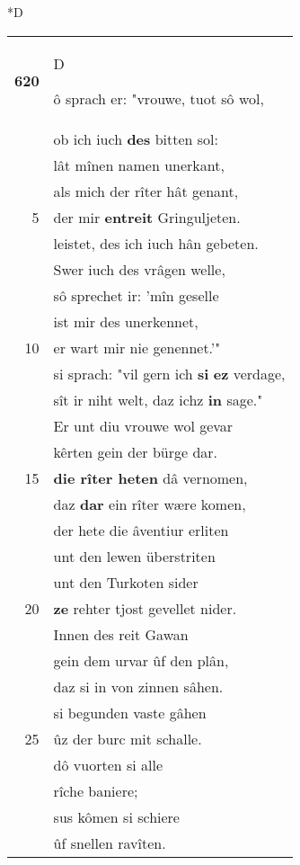 \documentclass[8pt,a4paper,notitlepage]{article}
\begin{document}
\begin{table}[ht]
\begin{minipage}[t]{0.5\linewidth}
\small
\begin{center}*D
\end{center}
\begin{tabular}{rl}
\textbf{620} & \begin{large}D\end{large}ô sprach er: "vrouwe, tuot sô wol,\\ 
 & ob ich iuch \textbf{des} bitten sol:\\ 
 & lât mînen namen unerkant,\\ 
 & als mich der rîter hât genant,\\ 
5 & der mir \textbf{entreit} Gringuljeten.\\ 
 & leistet, des ich iuch hân gebeten.\\ 
 & Swer iuch des vrâgen welle,\\ 
 & sô sprechet ir: 'mîn geselle\\ 
 & ist mir des unerkennet,\\ 
10 & er wart mir nie genennet.'"\\ 
 & si sprach: "vil gern ich \textbf{si} \textbf{ez} verdage,\\ 
 & sît ir niht welt, daz ichz \textbf{in} sage."\\ 
 & Er unt diu vrouwe wol gevar\\ 
 & kêrten gein der bürge dar.\\ 
15 & \textbf{die rîter heten} dâ vernomen,\\ 
 & daz \textbf{dar} ein rîter wære komen,\\ 
 & der hete die âventiur erliten\\ 
 & unt den lewen überstriten\\ 
 & unt den Turkoten sider\\ 
20 & \textbf{ze} rehter tjost gevellet nider.\\ 
 & Innen des reit Gawan\\ 
 & gein dem urvar ûf den plân,\\ 
 & daz si in von zinnen sâhen.\\ 
 & si begunden vaste gâhen\\ 
25 & ûz der burc mit schalle.\\ 
 & dô vuorten si alle\\ 
 & rîche baniere;\\ 
 & sus kômen si schiere\\ 
 & ûf snellen ravîten.\\ 

\end{tabular}
\end{minipage}
\end{table}
\end{document}

